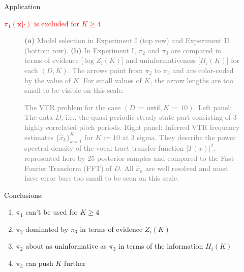\documentclass[10pt,xcolor={dvipsnames}]{beamer}
\newcommand{\bx}{{\bm x}}
\newcommand{\data}[1]{{\mathsf{#1}}}
\newcommand{\until}{\data{until}}
\newcommand{\numb}[1]{\mathsf{#1}}
\newcommand{\bm}{\boldsymbol}
\newcommand{\pgffigure}[2]{%
\scalebox{#2}{}
}
\begin{document}
\begin{frame}[label=current]{Application}
\begin{overprint}
\begin{center}
\alert{\textcolor{red}{$\pi_1(\bx|\cdot)$ is excluded for $K \geq 4$}}
\end{center}

\onslide<+->
\begin{figure}[t]      
\centering
\subfloat[]{\pgffigure{bars.pgf}{.62}}
\qquad
\subfloat[]{\pgffigure{arrow.pgf}{.62}}
\caption{%
\footnotesize
\justifying
\textcolor{gray}{%
{\bf (a)}
Model selection in Experiment I (top row) and Experiment II (bottom row).
{\bf (b)}
In Experiment I, $\pi_2$ and $\pi_3$ are compared in terms of evidence [$\log{Z_i(K)}$] and uninformativeness [$H_i(K)$] for each $(D,K)$.
The arrows point from $\pi_2$ to $\pi_3$ and are color-coded by the value of $K$.
For small values of $K$, the arrow lengths are too small to be visible on this scale.
}
}
\end{figure}

\onslide<+->
\begin{figure}[t]
\pgffigure{spectrum.pgf}{.62}
\caption{%
\footnotesize
\justifying
\textcolor{gray}{%
The VTR problem for the case $(D := \until, K := 10)$.
Left panel:
The data $D$, i.e., the quasi-periodic steady-state part consisting of 3 highly correlated pitch periods.
Right panel:
Inferred VTR frequency estimates $\{\hat{x}_k\}_{k=1}^K$ for $K := 10$ at 3 sigma.
They describe the power spectral density of the vocal tract transfer function $|T(x)|^2$, represented here by 25 posterior samples and compared to the Fast Fourier Transform (FFT) of $D$.
All $\hat{x}_k$ are well resolved and most have error bars too small to be seen on this scale.
\label{spectrum}
}
}
\end{figure}

\onslide<+->

\begin{center}
\alert{Conclusions:}\\
\end{center}

\begin{enumerate}
\widesep
\item $\pi_1$ can't be used for $K \geq 4$
\item $\pi_2$ dominated by $\pi_3$ in terms of \alert{evidence} $Z_i(K)$
\item $\pi_2$ about as uninformative as $\pi_3$ in terms of the \alert{information} $H_i(K)$
\item $\pi_3$ can push $K$ further
\end{enumerate}

\end{overprint}
\end{frame}
\end{document}
